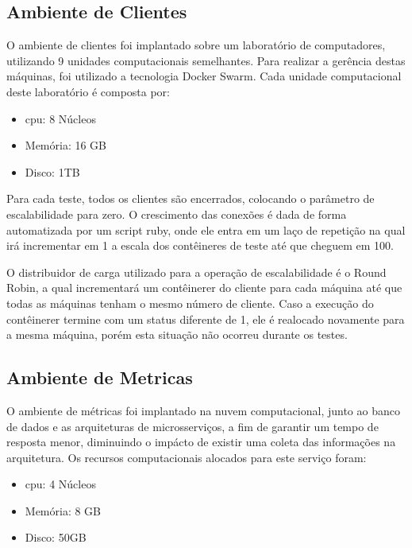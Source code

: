 \subsection{Ambiente de Clientes}
\label{sec:ambiente_cli}

O ambiente de clientes foi implantado sobre um laboratório de computadores, utilizando 9 unidades computacionais semelhantes.
%
Para realizar a gerência destas máquinas, foi utilizado a tecnologia Docker Swarm.
%
Cada unidade computacional deste laboratório é composta por:

\begin{itemize}
  \item \ac{cpu}: 8 Núcleos
  \item Memória: 16 GB
  \item Disco: 1TB
\end{itemize}

Para cada teste, todos os clientes são encerrados, colocando o parâmetro de escalabilidade para zero.
%
O crescimento das conexões é dada de forma automatizada por um script ruby, onde ele entra em um laço de repetição na qual irá incrementar em 1 a escala dos contêineres de teste até que cheguem em 100.

O distribuidor de carga utilizado para a operação de escalabilidade é o Round Robin, a qual incrementará um contêinerer do cliente para cada máquina até que todas as máquinas tenham o mesmo número de cliente.
%
Caso a execução do contêinerer termine com um status diferente de 1, ele é realocado novamente para a mesma máquina, porém esta situação não ocorreu durante os testes.

\subsection{Ambiente de Metricas}
\label{sec:ambiente_met}

O ambiente de métricas foi implantado na nuvem computacional, junto ao banco de dados e as arquiteturas de microsserviços, a fim de garantir um tempo de resposta menor, diminuindo o impácto de existir uma coleta das informações na arquitetura.
%
Os recursos computacionais alocados para este serviço foram:

\begin{itemize}
  \item \ac{cpu}: 4 Núcleos
  \item Memória: 8 GB
  \item Disco: 50GB
\end{itemize}

